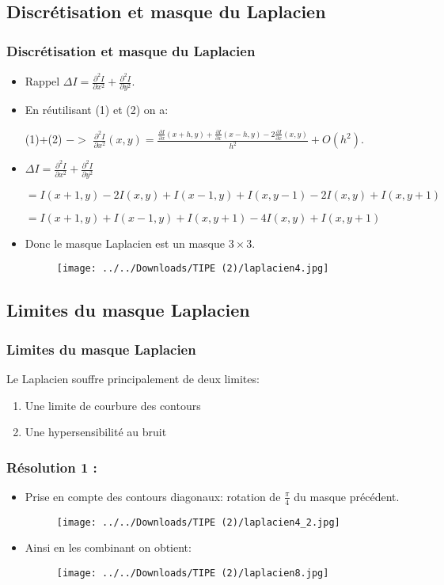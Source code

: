 \documentclass{beamer}
\newcommand{\divp}[2]
	{
	  \frac{\partial #1}{\partial #2}
	}
\newcommand{\divpsnd}[2]
	{
	  \frac{\partial^2 #1}{\partial #2^2}
	}
\begin{document}
\subsection{Discrétisation et masque du Laplacien}
\begin{frame}
\frametitle{Discrétisation et masque du Laplacien}
\begin{itemize}
\item <1->Rappel $\Delta I = \divpsnd{I}{x} + \divpsnd{I}{y}$.

\item <1-> En réutilisant (1) et (2) on a:

(1)+(2) $->$ $\divpsnd{I}{x}(x,y) = \frac{\divp{I}{x}(x+h,y)+\divp{I}{x}(x-h,y)-2\divp{I}{x}(x,y)}{h^2} + O(h^2)$.


\item <2-> $\Delta I = \divpsnd{I}{x} + \divpsnd{I}{y}$

$=I(x+1,y) -2I(x,y) + I(x-1,y) + I(x,y-1) -2I(x,y) + I(x,y+1) $

$= I(x+1,y) + I(x-1,y) + I(x,y+1) - 4I(x,y) + I(x,y+1)$

\item <3-> Donc le masque Laplacien est un masque $3 \times 3$.
\begin{figure}
\texttt{[image: ../../Downloads/TIPE (2)/laplacien4.jpg]}
\end{figure}
\end{itemize}
\end{frame}

\subsection{Limites du masque Laplacien}

\begin{frame}
\frametitle{Limites du masque Laplacien}

Le Laplacien souffre principalement de deux limites:

\begin{enumerate}
\item Une limite de courbure des contours
\item Une hypersensibilité au bruit
\end{enumerate}
\end{frame}

\begin{frame}
\frametitle{Résolution 1 :}
\begin{itemize}

\item Prise en compte des contours diagonaux: rotation de $\frac{\pi}{4}$ du masque précédent.
\begin{figure}
\texttt{[image: ../../Downloads/TIPE (2)/laplacien4\_2.jpg]}
\end{figure}

\item Ainsi en les combinant on obtient:

\begin{figure}
\texttt{[image: ../../Downloads/TIPE (2)/laplacien8.jpg]}
\end{figure}
\end{itemize}
\end{frame}
\end{document}
